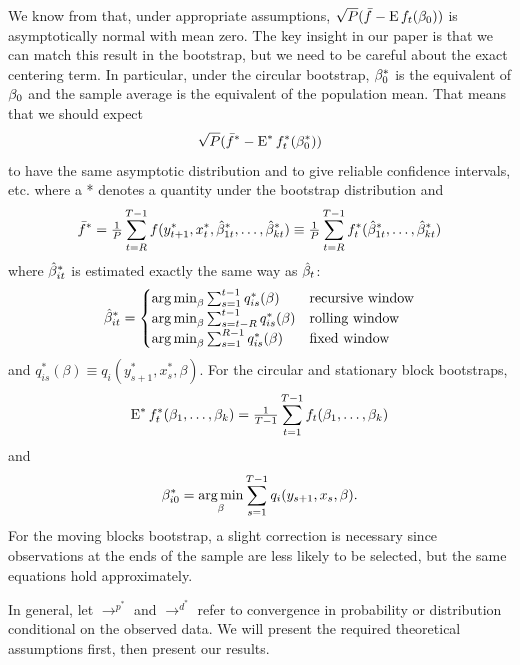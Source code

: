 \documentclass[12pt,fleqn]{article}
\begin{document}
We know from \citet{Wes:96} that, under appropriate assumptions,
$\sqrt{P} (\bar f - \operatorname{E} f_t(\beta_0))$ is asymptotically normal with mean
zero. The key insight in our paper is that we can match this result in
the bootstrap, but we need to be careful about the exact centering
term.  In particular, under the circular bootstrap, $\beta_0^*$ is the
equivalent of $\beta_0$ and the sample average is the equivalent of the
population mean. That means that we should expect
\begin{equation*}
  \sqrt{P} (\bar f^* - \operatorname{E}^* f_t^*(\beta_0^*))
\end{equation*}
to have the same asymptotic distribution and to give reliable
confidence intervals, etc. where a * denotes a quantity under the
bootstrap distribution and
\begin{equation}
  \bar f^* = \tfrac{1}{P} \sum_{t=R}^{T-1} f(y_{t+1}^*, x_t^*, \hat \beta_{1t}^*,\dots,\hat \beta_{kt}^*)
  \equiv \tfrac{1}{P} \sum_{t=R}^{T-1} f_t^*(\hat \beta_{1t}^*,\dots,\hat \beta_{kt}^*)
\end{equation}
where $\hat \beta_{it}^*$ is estimated exactly the same way as $\hat \beta_t$:
\begin{equation}\label{eq:10}
  \hat\beta_{it}^* = \begin{cases}
    \operatorname*{arg\,min}_\beta \sum_{s=1}^{t-1} q_{is}^*(\beta) & \text{recursive window} \\
    \operatorname*{arg\,min}_\beta \sum_{s=t-R}^{t-1} q_{is}^*(\beta) & \text{rolling window} \\
    \operatorname*{arg\,min}_\beta \sum_{s=1}^{R-1} q_{is}^*(\beta) & \text{fixed window}
  \end{cases}
\end{equation}
and $q_{is}^*(\beta) \equiv q_i(y_{s+1}^*, x_s^*, \beta)$.
For the circular and stationary block bootstraps,
\begin{equation*}
  \operatorname{E}^* f_t^*(\beta_1,\dots,\beta_k) = \tfrac{1}{T-1} \sum_{t=1}^{T-1} f_t(\beta_1,\dots,\beta_k)
\end{equation*}
and
\begin{equation*}
  \beta_{i0}^* = \operatorname*{arg\,min}_\beta \sum_{s=1}^{T-1} q_i(y_{s+1}, x_s, \beta).
\end{equation*}
For the moving blocks bootstrap, a slight correction is necessary
since observations at the ends of the sample are less likely to be
selected, but the same equations hold approximately.

In general, let $\to^{p^{*}}$ and $\to^{d^{*}}$ refer to convergence
in probability or distribution conditional on the observed data.
We will present the required theoretical assumptions first, then
present our results.
\end{document}
